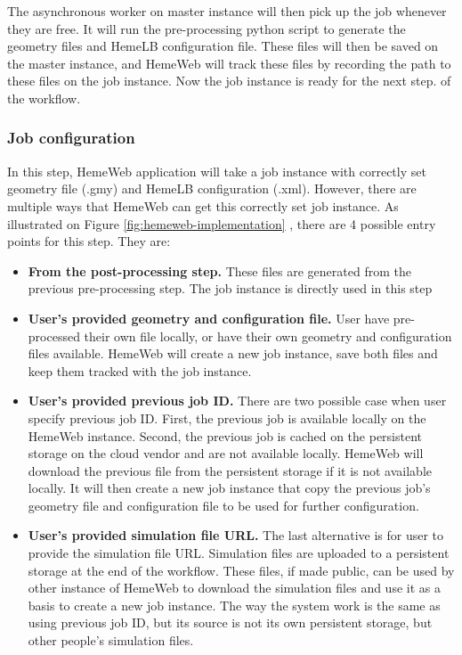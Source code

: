 The asynchronous worker on master instance will then pick up the job whenever they are free. It will run the pre-processing python script to generate the geometry files and HemeLB configuration file. These files will then be saved on the master instance, and HemeWeb will track these files by recording the path to these files on the job instance. Now the job instance is ready for the next step. of the workflow.

\subsubsection{Job configuration}

In this step, HemeWeb application will take a job instance with correctly set geometry file (.gmy) and HemeLB configuration (.xml). However, there are multiple ways that HemeWeb can get this correctly set job instance. As illustrated on Figure \ref{fig:hemeweb-implementation} , there are 4 possible entry points for this step. They are:

\begin{itemize}
    \item \textbf{From the post-processing step.}
    	These files are generated from the previous pre-processing step. The job instance is directly used in this step
    
    \item \textbf{User's provided geometry and configuration file.}
    	User have pre-processed their own file locally, or have their own geometry and configuration files available. HemeWeb will create a new job instance, save both files and keep them tracked with the job instance.
	
    \item \textbf{User's provided previous job ID.}
    	There are two possible case when user specify previous job ID. First, the previous job is available locally on the HemeWeb instance. Second, the previous job is cached on the persistent storage on the cloud vendor and are not available locally. HemeWeb will download the previous file from the persistent storage if it is not available locally. It will then create a new job instance that copy the previous job's geometry file and configuration file to be used for further configuration.
    
    \item \textbf{User's provided simulation file URL.}
    	The last alternative is for user to provide the simulation file URL. Simulation files are uploaded to a persistent storage at the end of the workflow. These files, if made public, can be used by other instance of HemeWeb to download the simulation files and use it as a basis to create a new job instance. The way the system work is the same as using previous job ID, but its source is not its own persistent storage, but other people's simulation files.

\end{itemize}


